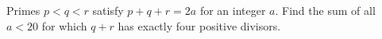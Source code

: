 Primes $p<q<r$ satisfy $p+q+r=2a$ for an integer $a$. Find the sum of all $a<20$ for which $q+r$ has exactly four positive divisors.
